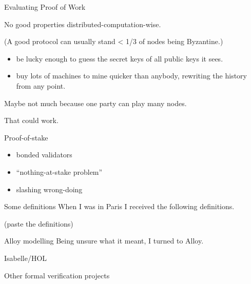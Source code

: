 \documentclass{beamer}
\begin{document}
\begin{frame}{Evaluating Proof of Work}

No good properties distributed-computation-wise.

(A good protocol can usually stand < 1/3 of nodes being Byzantine.)

\begin{itemize}
\item be lucky enough to guess the secret keys of all public keys it sees.
\end{itemize}

\begin{itemize}
\item buy lots of machines to mine quicker than anybody, rewriting the history from any point.
\end{itemize}

Maybe not much because one party can play many nodes.

That could work.
\end{frame}


\begin{frame}{Proof-of-stake}
\begin{itemize}
\item bonded validators
\item ``nothing-at-stake problem''
\item slashing wrong-doing
\end{itemize}
\end{frame}


\begin{frame}{Some definitions}
When I was in Paris I received the following definitions.

(paste the definitions)
\end{frame}

\begin{frame}{Alloy modelling}
Being unsure what it meant, I turned to Alloy.
\end{frame}


\begin{frame}{Isabelle/HOL}

\end{frame}


\begin{frame}{Other formal verification projects}
\end{frame}
\end{document}
